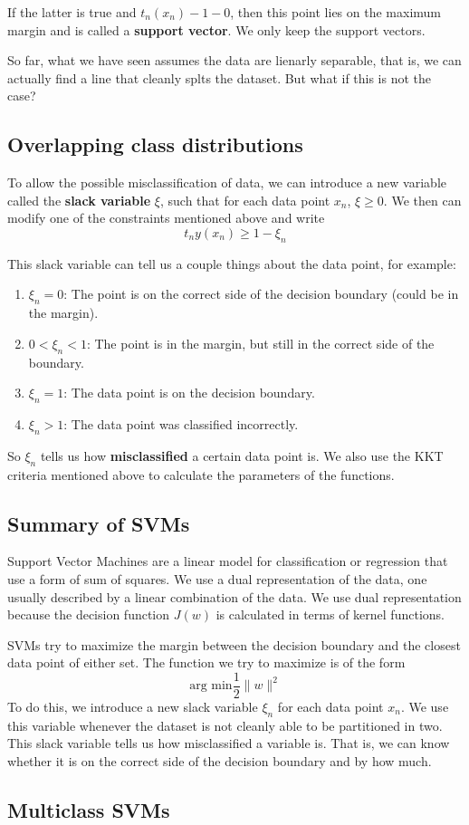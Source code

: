 \documentclass{tufte-handout}
\begin{document}
		If the latter is true and $t_{n}(x_{n}) - 1 -0$, then this point lies on the maximum margin and 
		is called a \textbf{support vector}. We only keep the support vectors.

		So far, what we have seen assumes the data are lienarly separable, that is, we can actually 
		find a line that cleanly splts the dataset. But what if this is not the case?
		\subsection{Overlapping class distributions}

		To allow the possible misclassification of data, we can introduce a new variable called the \textbf{slack
		variable} $\xi$, such that for each data point $x_{n}$, $\xi \geq 0$. We then can modify one of
		the constraints mentioned above and write 
		\[ t_{n}y(x_{n}) \geq 1 - \xi_{n}\]

		This slack variable can tell us a couple things about the data point, for example:
		\begin{enumerate}
				\item $\xi_{n} = 0$: The point is on the correct side of the decision boundary (could be in the
						margin).
				\item $0 < \xi_{n} < 1$: The point is in the margin, but still in the correct side of the 
						boundary.
				\item $\xi_{n} = 1$: The data point is on the decision boundary.
				\item $\xi_{n} > 1$: The data point was classified incorrectly.
		\end{enumerate}
		So $\xi_{n}$ tells us how \textbf{misclassified} a certain data point is. We also use the KKT criteria
		mentioned above to calculate the parameters of the functions.

		\subsection{Summary of SVMs}
		Support Vector Machines are a linear model for classification or regression that use a form of
		sum of squares. We use a dual representation of the data, one usually described by a linear
		combination of the data. We use dual representation because the decision function $J(w)$ is
		calculated in terms of kernel functions.

		SVMs try to maximize the margin between the decision boundary and the closest data point of either set.
		The function we try to maximize is of the form 
		\[ \textrm{arg min}\frac{1}{2}\|w\|^{2}\]
		To do this, we introduce a new slack variable $\xi_{n}$ for each data point $x_{n}$. We use this 
		variable whenever the dataset is not cleanly able to be partitioned in two.  This slack variable 
		tells us how misclassified a variable is. That is, we can know whether it is on the correct side
		of the decision boundary and by how much.
		\subsection{Multiclass SVMs}
\end{document}
